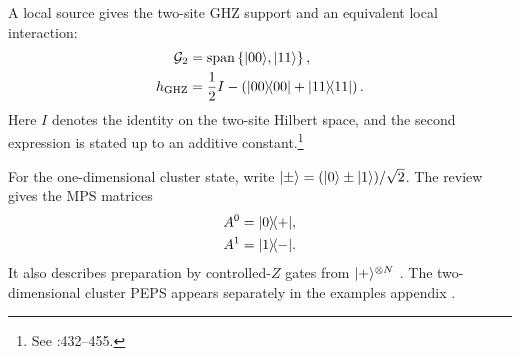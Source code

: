 \documentclass{article}
\begin{document}
A local source gives the two-site GHZ support and an equivalent local
interaction:
\begin{align}
    \mathcal G_2
        &=
        \operatorname{span}
        \left\{|00\rangle,|11\rangle\right\},
    \label{eq:rmp_example_parent_hamiltonian_scope_ghz_two_site_support}\\
    h_{\mathrm{GHZ}}
        &=
        \frac{1}{2}I
        -
        \left(|00\rangle\!\langle 00|
            +
            |11\rangle\!\langle 11|\right).
    \label{eq:rmp_example_parent_hamiltonian_scope_ghz_local_interaction}
\end{align}
Here $I$ denotes the identity on the two-site Hilbert space, and the second
expression is stated up to an additive constant.\footnote{See
:432--455.}

For the one-dimensional cluster state, write
$|\pm\rangle=(|0\rangle\pm|1\rangle)/\sqrt2$. The review gives the MPS matrices
\begin{align}
    A^0
        &=
        |0\rangle\!\langle +|,
    \label{eq:rmp_example_parent_hamiltonian_scope_cluster_matrix_zero}\\
    A^1
        &=
        |1\rangle\!\langle -|.
    \label{eq:rmp_example_parent_hamiltonian_scope_cluster_matrix_one}
\end{align}
It also describes preparation by controlled-$Z$ gates from
$|+\rangle^{\otimes N}$ \cite[lines~2364--2369]{Cirac2021Matrix}. The
two-dimensional cluster PEPS appears separately in the examples appendix
\cite[lines~2424--2429]{Cirac2021Matrix}.
\end{document}
